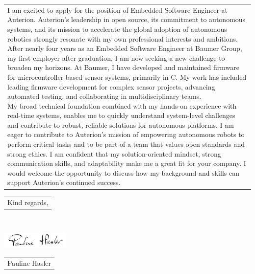 \documentclass[11pt,A4,german]{article}
\newcommand{\mpwidth}{\linewidth-\fboxsep-\fboxsep}
\newcommand{\cvtext}[1] {
  \begin{tabular*}{1\mpwidth}{p{0.98\mpwidth}}
    \parbox{1\mpwidth}{#1}
  \end{tabular*}
}
\begin{document}
\cvtext{I am excited to apply for the position of Embedded Software Engineer at Auterion. Auterion's leadership in open source, its commitment to autonomous systems, and its mission to accelerate the global adoption of autonomous robotics strongly resonate with my own professional interests and ambitions.
\newline
\newline
After nearly four years as an Embedded Software Engineer at Baumer Group, my first employer after graduation, I am now seeking a new challenge to broaden my horizons.
\newline
\newline
At Baumer, I have developed and maintained firmware for microcontroller-based sensor systems, primarily in C. My work has included leading firmware development for complex sensor projects, advancing automated testing, and collaborating in multidisciplinary teams.\\My broad technical foundation combined with my hands-on experience with real-time systems, enables me to quickly understand system-level challenges and contribute to robust, reliable solutions for autonomous platforms.
\newline
\newline
I am eager to contribute to Auterion's mission of empowering autonomous robots to perform critical tasks and to be part of a team that values open standards and strong ethics. I am confident that my solution-oriented mindset, strong communication skills, and adaptability make me a great fit for your company.
\newline
\newline
I would welcome the opportunity to discuss how my background and skills can support Auterion's continued success.
\newline
\newline
}



\cvtext{Kind regards,}\\[20pt]

\begin{flushleft}
    \includegraphics[width=0.25\textwidth]{../resources/Signature.jpg}
\end{flushleft}
\cvtext{\vspace{-35pt}\hspace{10pt}Pauline Hasler}
\end{document}
